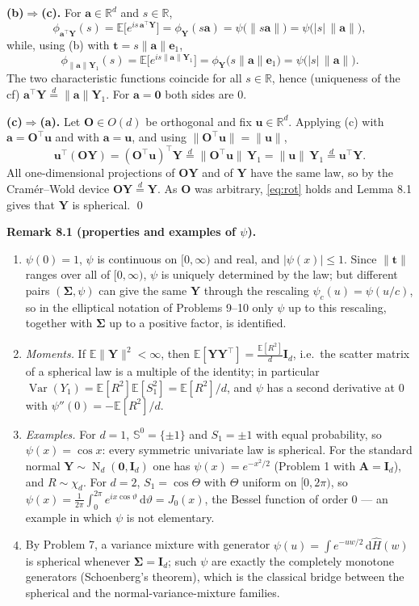 \documentclass{MFM-hw} %
\newcommand{\real}{\mathbb{R}}
\newcommand{\normal}{\operatorname{N}}
\newcommand{\dd}{\,\mathrm{d}}
\newcommand{\E}{\mathbb{E}}
\newcommand{\Var}{\operatorname{Var}}
\newcommand{\bY}{\bm{Y}}
\newcommand{\bA}{\bm{A}}
\newcommand{\bI}{\bm{I}}
\newcommand{\bt}{\bm{t}}
\newcommand{\bu}{\bm{u}}
\newcommand{\ba}{\bm{a}}
\newcommand{\be}{\bm{e}}
\newcommand{\bO}{\bm{O}}
\newcommand{\bSigma}{\bm{\Sigma}}
\newcommand{\bzero}{\bm{0}}
\begin{document}
\smallskip
\noindent\textbf{(b)$\Rightarrow$(c).} For $\ba\in\real^d$ and $s\in\real$,
\[
    \phi_{\ba^\top\bY}(s)=\E\bigl[e^{is\,\ba^\top\bY}\bigr]=\phi_{\bY}(s\ba)=\psi\bigl(\|s\ba\|\bigr)=\psi\bigl(|s|\,\|\ba\|\bigr),
\]
while, using (b) with $\bt=s\|\ba\|\be_1$,
\[
    \phi_{\|\ba\|\bY_1}(s)=\E\bigl[e^{is\|\ba\|\bY_1}\bigr]=\phi_{\bY}\bigl(s\|\ba\|\be_1\bigr)=\psi\bigl(|s|\,\|\ba\|\bigr).
\]
The two characteristic functions coincide for all $s\in\real$, hence (uniqueness of the cf) $\ba^\top\bY\overset{d}{=}\|\ba\|\bY_1$. For $\ba=\bzero$ both sides are $0$.

\smallskip
\noindent\textbf{(c)$\Rightarrow$(a).} Let $\bO\in O(d)$ be orthogonal and fix $\bu\in\real^d$. Applying (c) with $\ba=\bO^\top\bu$ and with $\ba=\bu$, and using $\|\bO^\top\bu\|=\|\bu\|$,
\[
    \bu^\top(\bO\bY)=(\bO^\top\bu)^\top\bY\overset{d}{=}\|\bO^\top\bu\|\,\bY_1=\|\bu\|\,\bY_1\overset{d}{=}\bu^\top\bY .
\]
All one-dimensional projections of $\bO\bY$ and of $\bY$ have the same law, so by the Cram\'er--Wold device $\bO\bY\overset{d}{=}\bY$. As $\bO$ was arbitrary, \eqref{eq:rot} holds and Lemma 8.1 gives that $\bY$ is spherical. \qed

\smallskip
\noindent\textbf{Remark 8.1 (properties and examples of $\psi$).}
\begin{enumerate}
    \item $\psi(0)=1$, $\psi$ is continuous on $[0,\infty)$ and real, and $|\psi(x)|\le1$. Since $\|\bt\|$ ranges over all of $[0,\infty)$, $\psi$ is uniquely determined by the law; but different pairs $(\bSigma,\psi)$ can give the same $\bY$ through the rescaling $\psi_c(u)=\psi(u/c)$, so in the elliptical notation of Problems 9--10 only $\psi$ up to this rescaling, together with $\bSigma$ up to a positive factor, is identified.
    \item \emph{Moments.} If $\E\|\bY\|^2<\infty$, then $\E[\bY\bY^\top]=\frac{\E[R^2]}{d}\bI_d$, i.e.\ the scatter matrix of a spherical law is a multiple of the identity; in particular $\Var(Y_1)=\E[R^2]\E[S_1^2]=\E[R^2]/d$, and $\psi$ has a second derivative at $0$ with $\psi''(0)=-\E[R^2]/d$.
    \item \emph{Examples.} For $d=1$, $\mathbb{S}^0=\{\pm1\}$ and $S_1=\pm1$ with equal probability, so $\psi(x)=\cos x$: every symmetric univariate law is spherical. For the standard normal $\bY\sim\normal_d(\bzero,\bI_d)$ one has $\psi(x)=e^{-x^2/2}$ (Problem 1 with $\bA=\bI_d$), and $R\sim\chi_d$. For $d=2$, $S_1=\cos\Theta$ with $\Theta$ uniform on $[0,2\pi)$, so $\psi(x)=\frac{1}{2\pi}\int_0^{2\pi}e^{ix\cos\vartheta}\dd\vartheta=J_0(x)$, the Bessel function of order $0$ --- an example in which $\psi$ is not elementary.
    \item By Problem 7, a variance mixture with generator $\psi(u)=\int e^{-uw/2}\dd\hat H(w)$ is spherical whenever $\bSigma=\bI_d$; such $\psi$ are exactly the completely monotone generators (Schoenberg's theorem), which is the classical bridge between the spherical and the normal-variance-mixture families.
\end{enumerate}
\end{document}
